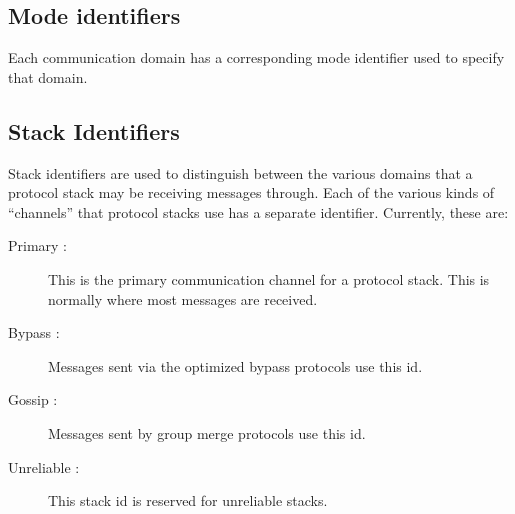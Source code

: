 \subsection{Mode identifiers}  
Each communication domain has a corresponding mode identifier used to
specify that domain.

\subsection{Stack Identifiers}
Stack identifiers are used to distinguish between the various domains that
a protocol stack may be receiving messages through.  Each of the various
kinds of ``channels'' that protocol stacks use has a separate identifier.
Currently, these are:
\begin{description}
\item
[Primary :] This is the primary communication channel for a protocol stack.
This is normally where most messages are received.
\item
[Bypass :] Messages sent via the optimized bypass protocols use this id. 
\item
[Gossip :] Messages sent by group merge protocols use this id.
\item
[Unreliable :] This stack id is reserved for unreliable stacks.
\end{description}
